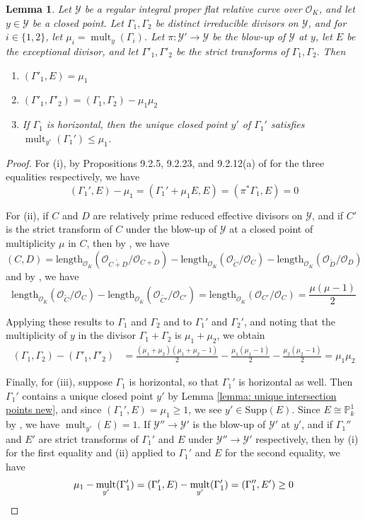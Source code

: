 \documentclass[12pt]{amsart}
\numberwithin{equation}{section}
\newtheorem{lemma}[equation]{Lemma}
\theoremstyle{definition}
\renewcommand{\O}{\mathcal{O}}
\renewcommand{\P}{\mathbb P}
\renewcommand{\l}[2]{\tx{length}_{\O_K}(\mathcal{O}_{#1}/\mathcal{O}_{#2})}
\newcommand{\Y}{\mathcal{Y}}
\newcommand{\tx}[1]{\text{#1}}
\DeclareMathOperator{\mult}{mult}
\begin{document}
\begin{lemma}\label{lemma: intersection number decreases with blow-up}
    Let $\Y$ be a regular integral proper flat relative curve over $\O_K$, and let $y\in\Y$ be a closed point. Let $\Gamma_1,\Gamma_2$ be distinct irreducible divisors on $\Y$, and for $i\in\{1,2\}$, let $\mu_i=\mult_y(\Gamma_i)$. Let $\pi:\Y'\to\Y$ be the blow-up of $\Y$ at $y$, let $E$ be the exceptional divisor, and let $\Gamma'_1,\Gamma'_2$ be the strict transforms of $\Gamma_1,\Gamma_2$. Then
    \begin{enumerate}[\upshape (i)]
        \item $(\Gamma'_1,E)=\mu_1$
        \item $(\Gamma'_1,\Gamma'_2)=(\Gamma_1,\Gamma_2)-\mu_1\mu_2$
        \item If $\Gamma_1$ is horizontal, then the unique closed point $y'$ of $\Gamma_1'$ satisfies $\mult_{y'}(\Gamma_1')\leq \mu_1$.
    \end{enumerate}
\end{lemma}
\begin{proof}
    For (i), by Propositions 9.2.5, 9.2.23, and 9.2.12(a) of \cite{Liu_book} for the three equalities respectively, we have
    \[(\Gamma_1',E)-\mu_1=(\Gamma_1'+\mu_1E,E)=(\pi^*\Gamma_1,E)=0\]
    
    For (ii), if $C$ and $D$ are relatively prime reduced effective divisors on $\Y$, and if $C'$ is the strict transform of $C$ under the blow-up of $\Y$ at a closed point of multiplicity $\mu$ in $C$, then by \cite[Lemma 3.1]{OSHyper}, we have
    \[(C,D)=\l{\widetilde{C+D}}{C+D}-\l{\widetilde{C}}{C}-\l{\widetilde{D}}{D}\]
    and by \cite[Lemma 3.3]{OSHyper}, we have
    \[\l{\widetilde{C}}{C}-\l{\widetilde{C'}}{C'}=\l{C'}{C}=\frac{\mu(\mu-1)}{2}\]
    
    Applying these results to $\Gamma_1$ and $\Gamma_2$ and to $\Gamma_1'$ and $\Gamma_2'$, and noting that the multiplicity of $y$ in the divisor $\Gamma_1+\Gamma_2$ is $\mu_1+\mu_2$, we obtain
    \begin{align*}
       (\Gamma_1,\Gamma_2)-(\Gamma'_1,\Gamma'_2)&=\frac{(\mu_1+\mu_2)(\mu_1+\mu_2-1)}{2}-\frac{\mu_1(\mu_1-1)}{2}-\frac{\mu_2(\mu_2-1)}{2}=\mu_1\mu_2
    \end{align*}

    Finally, for (iii), suppose $\Gamma_1$ is horizontal, so that $\Gamma_1'$ is horizontal as well. Then $\Gamma_1'$ contains a unique closed point $y'$ by Lemma \ref{lemma: unique intersection points new}, and since $(\Gamma_1',E)=\mu_1\geq 1$, we see $y'\in\tx{Supp}(E)$. Since $E\cong\P^1_k$ by \cite[Proposition 9.2.5]{Liu_book}, we have $\mult_{y'}(E)=1$. If $\Y''\to\Y'$ is the blow-up of $\Y'$ at $y'$, and if $\Gamma_1''$ and $E'$ are strict transforms of $\Gamma_1'$ and $E$ under $\Y''\to\Y'$ respectively, then by (i) for the first equality and (ii) applied to $\Gamma_1'$ and $E$ for the second equality, we have
    \[\mu_1-\mult_{y'}(\Gamma_1')=(\Gamma_1',E)-\mult_{y'}(\Gamma_1')=(\Gamma_1'',E')\geq0\qedhere\]
\end{proof}
\end{document}
